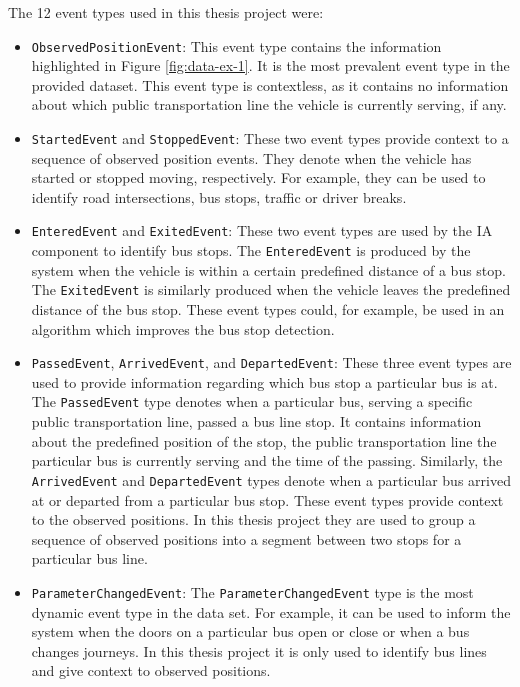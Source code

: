 The 12 event types used in this thesis project were:
\begin{itemize}
    \item \texttt{ObservedPositionEvent}:
    This event type contains the information highlighted in Figure \ref{fig:data-ex-1}.
    It is the most prevalent event type in the provided dataset.
    This event type is contextless, as it contains no information about which public transportation line the vehicle is currently serving, if any. 
    
    \item \texttt{StartedEvent} and \texttt{StoppedEvent}:
    These two event types provide context to a sequence of observed position events.
    They denote when the vehicle has started or stopped moving, respectively.
    For example, they can be used to identify road intersections, bus stops, traffic or driver breaks.
    
    \item \texttt{EnteredEvent} and \texttt{ExitedEvent}:
    These two event types are used by the IA component to identify bus stops.
    The \texttt{EnteredEvent} is produced by the system when the vehicle is within a certain predefined distance of a bus stop.
    The \texttt{ExitedEvent} is similarly produced when the vehicle leaves the predefined distance of the bus stop.
    These event types could, for example, be used in an algorithm which improves the bus stop detection.
    
    \item \texttt{PassedEvent}, \texttt{ArrivedEvent}, and \texttt{DepartedEvent}:
    These three event types are used to provide information regarding which bus stop a particular bus is at.
    The \texttt{PassedEvent} type denotes when a particular bus, serving a specific public transportation line, passed a bus line stop.
    It contains information about the predefined position of the stop, the public transportation line the particular bus is currently serving and the time of the passing.
    Similarly, the \texttt{ArrivedEvent} and \texttt{DepartedEvent} types denote when a particular bus arrived at or departed from a particular bus stop.
    These event types provide context to the observed positions.
    In this thesis project they are used to group a sequence of observed positions into a segment between two stops for a particular bus line.
    
    \item \texttt{ParameterChangedEvent}:  
    The \texttt{ParameterChangedEvent} type is the most dynamic event type in the data set.
    For example, it can be used to inform the system when the doors on a particular bus open or close or when a bus changes journeys.
    In this thesis project it is only used to identify bus lines and give context to observed positions.
    

\end{itemize}
